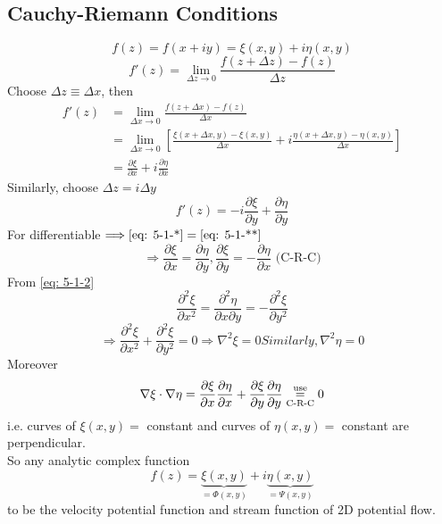\subsection{Cauchy-Riemann Conditions}
\[
f(z) = f(x+iy) = \xi(x,y) + i\eta(x,y)
\]
\[
f'(z) = \lim_{\Delta z\to 0}\frac{f(z+\Delta z)-f(z)}{\Delta z}
\]
Choose $\Delta z \equiv \Delta x$, then
\begin{align}
f'(z) 
&= \lim_{\Delta x\to 0}\frac{f(z+\Delta x)-f(z)}{\Delta x}\nonumber \\
&= \lim_{\Delta x\to 0}\left[\frac{\xi(x+\Delta x,y)-\xi(x,y)}{\Delta x} + i\frac{\eta(x+\Delta x,y)-\eta(x,y)}{\Delta x}\right]\nonumber \\
&= \frac{\partial\xi}{\partial x} + i\frac{\partial\eta}{\partial x}\tag{$\ast$} \label{eq: 5-1-*}
\end{align}
Similarly, choose $\Delta z = i\Delta y$
\begin{equation}
f'(z) = -i\frac{\partial\xi}{\partial y} + \frac{\partial\eta}{\partial y}
\tag{$\ast\ast$}\label{eq: 5-1-**}
\end{equation}
For differentiable $\Longrightarrow\eqref{eq: 5-1-*}=\eqref{eq: 5-1-**}$
\begin{equation}
\Longrightarrow
\boxed{
\frac{\partial\xi}{\partial x} = \frac{\partial\eta}{\partial y},\frac{\partial\xi}{\partial y} = -\frac{\partial\eta}{\partial x}
}
\text{ (C-R-C)}
\label{eq: 5-1-2}
\end{equation}
From \eqref{eq: 5-1-2} 
\[
\frac{\partial^2\xi}{\partial x^2} = \frac{\partial^2\eta}{\partial x\partial y} = -\frac{\partial^2\xi}{\partial y^2}
\]
\begin{subequations}
\begin{equation}
\Longrightarrow\frac{\partial^2\xi}{\partial x^2} + \frac{\partial^2\xi}{\partial y^2} = 0\Longrightarrow\nabla^2\xi = 0
\label{eq: 5-1-3a}
\end{equation}
Similarly,
\begin{equation}
\nabla^2\eta = 0
\label{eq: 5-1-3b}
\end{equation}
\end{subequations}
Moreover
\[
\nabla\xi\cdot\nabla\eta = \frac{\partial\xi}{\partial x}\frac{\partial\eta}{\partial x} + \frac{\partial\xi}{\partial y}\frac{\partial\eta}{\partial y}\vc{=}{\text{use}}{\text{C-R-C}}0
\]
i.e. curves of $\xi(x,y)=$ constant and curves of $\eta(x,y)=$ constant are perpendicular. \\
So any analytic complex function
\[
f(z) = \underbrace{\xi(x,y)}_{=\Phi(x,y)} + i\underbrace{\eta(x,y)}_{=\Psi(x,y)}
\]
to be the velocity potential function and stream function of 2D potential flow.
